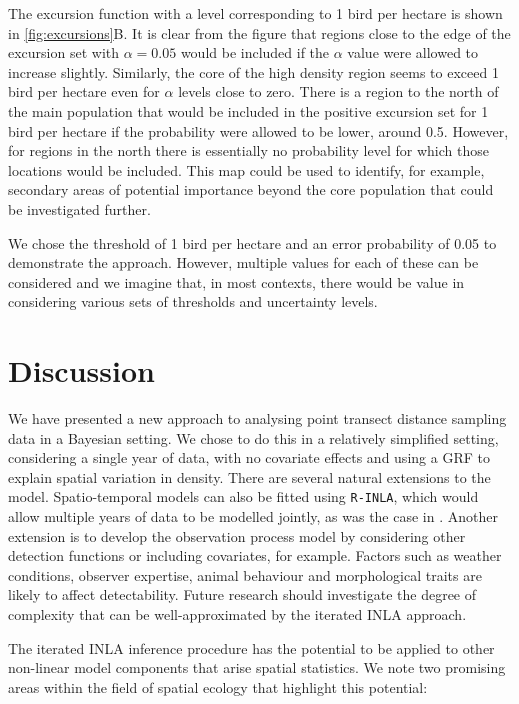 \documentclass{statsoc}
\begin{document}
The excursion function with a level corresponding to 1 bird per hectare is shown in \autoref{fig:excursions}B.  It is clear from the figure that regions close to the edge of the excursion set with $\alpha = 0.05$ would be included if the $\alpha$ value were allowed to increase slightly.  Similarly, the core of the high density region seems to exceed 1 bird per hectare even for $\alpha$ levels close to zero.  There is a region to the north of the main population that would be included in the positive excursion set for 1 bird per hectare if the probability were allowed to be lower, around 0.5.  However, for regions in the north there is essentially no probability level for which those locations would be included.  This map could be used to identify, for example, secondary areas of potential importance beyond the core population that could be investigated further.

We chose the threshold of 1 bird per hectare and an error probability of 0.05 to demonstrate the approach.  However, multiple values for each of these can be considered and we imagine that, in most contexts, there would be value in considering various sets of thresholds and uncertainty levels.


\section{Discussion}
\label{sec-discussion}

We have presented a new approach to analysing point transect distance sampling data in a Bayesian setting.  We chose to do this in a relatively simplified setting, considering a single year of data, with no covariate effects and using a GRF to explain spatial variation in density.  There are several natural extensions to the model.  Spatio-temporal models can also be fitted using \texttt{R-INLA}, which would allow multiple years of data to be modelled jointly, as was the case in \cite{camp_dsm_2020}.  Another extension is to develop the observation process model by considering other detection functions or including covariates, for example.  Factors such as weather conditions, observer expertise, animal behaviour and morphological traits are likely to affect detectability.  Future research should investigate the degree of complexity that can be well-approximated by the iterated INLA approach.

The iterated INLA inference procedure has the potential to be applied to other non-linear model components that arise spatial statistics.  We note two promising areas within the field of spatial ecology that highlight this potential: 
\end{document}
